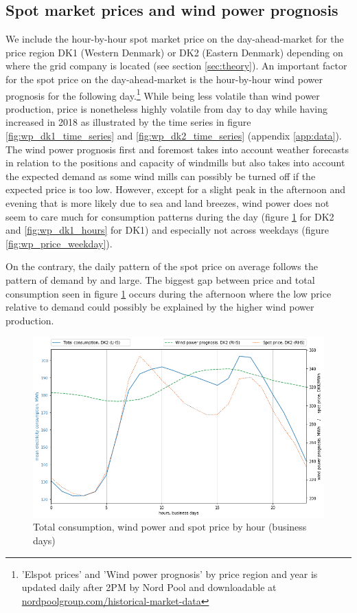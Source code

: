 \subsection{Spot market prices and wind power prognosis}
\label{subsec:d_spot}
We include the hour-by-hour spot market price on the day-ahead-market for the price region DK1 (Western Denmark) or DK2 (Eastern Denmark) depending on where the grid company is located (see section \ref{sec:theory}). An important factor for the spot price on the day-ahead-market is the hour-by-hour wind power prognosis for the following day.\footnote{'Elspot prices' and 'Wind power prognosis' by price region and year is updated daily after 2PM by Nord Pool and downloadable at \href{https://www.nordpoolgroup.com/historical-market-data/}{nordpoolgroup.com/historical-market-data}} While being less volatile than wind power production, price is nonetheless highly volatile from day to day while having increased in 2018 as illustrated by the time series in figure \ref{fig:wp_dk1_time_series} and \ref{fig:wp_dk2_time_series} (appendix \ref{app:data}).
\medskip\\
The wind power prognosis first and foremost takes into account weather forecasts in relation to the positions and capacity of windmills but also takes into account the expected demand as some wind mills can possibly be turned off if the expected price is too low. However, except for a slight peak in the afternoon and evening that is more likely due to sea and land breezes, wind power does not seem to care much for consumption patterns during the day (figure \ref{fig:trio_DK2_hours} for DK2 and \ref{fig:wp_dk1_hours} for DK1) and especially not across weekdays (figure \ref{fig:wp_price_weekday}).
\par
On the contrary, the daily pattern of the spot price on average follows the pattern of demand by and large. The biggest gap between price and total consumption seen in figure \ref{fig:trio_DK2_hours} occurs during the afternoon where the low price relative to demand could possibly be explained by the higher wind power production.
\begin{figure}[H]
  \centering
  \caption{Total consumption, wind power and spot price by hour (business days)}
  \label{fig:trio_DK2_hours}
    \includegraphics[width=1 \textwidth]{03_figures/trio_DK2_hours, business days}
\end{figure}


